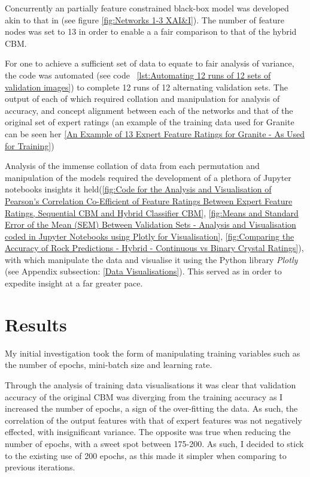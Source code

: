 Concurrently an partially feature constrained black-box model was developed akin to that in \cite{grangeXAISelfexplanatoryAI2022} (see figure \ref{fig:Networks 1-3 XAI&I}). The number of feature nodes was set to 13 in order to enable a a fair comparison to that of the hybrid CBM.

For one to achieve a sufficient set of data to equate to fair analysis of variance, the code was automated (see code ~\ref{lst:Automating 12 runs of 12 sets of validation images}) to complete 12 runs of 12 alternating validation sets. The output of each of which required collation and manipulation for analysis of accuracy, and concept alignment between each of the networks and that of the original set of expert ratings (an example of the training data used for Granite can be seen her \ref{An Example of 13 Expert Feature Ratings for Granite - As Used for Training})

Analysis of the immense collation of data from each permutation and manipulation of the models required the development of a plethora of Jupyter notebooks insights it held(\ref{fig:Code for the Analysis and Visualisation of Pearson's Correlation Co-Efficient of Feature Ratings Between Expert Feature Ratings, Sequential CBM and Hybrid Classifier CBM}, \ref{fig:Means and Standard Error of the Mean (SEM) Between Validation Sets - Analysis and Visualisation coded in Jupyter Notebooks using Plotly for Visualisation}, \ref{fig:Comparing the Accuracy of Rock Predictions - Hybrid - Continuous vs Binary Crystal Ratings}), with which manipulate the data and visualise it using the Python library \emph{Plotly} \cite{plotly} (see Appendix subsection: \ref{Data Visualisations}). This served as in order to expedite insight at a far greater pace.

\newpage
\section{Results}

My initial investigation took the form of manipulating training variables such as the number of epochs, mini-batch size and learning rate.

Through the analysis of training data visualisations it was clear that  validation accuracy of the original CBM was diverging from the training accuracy as I increased the number of epochs, a sign of the over-fitting the data. As such, the correlation of the output features with that of expert features was not negatively effected, with insignificant variance. The opposite was true when reducing the number of epochs, with a sweet spot between 175-200. As such, I decided to stick to the existing use of 200 epochs, as this made it simpler when comparing to previous iterations.

